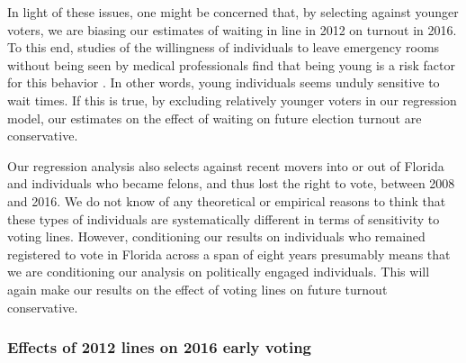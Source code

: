 \documentclass[12pt,titlepage]{article}
\begin{document}
In light of these issues, one might be concerned that, by selecting
against younger voters, we are biasing our estimates of waiting in
line in 2012 on turnout in 2016.  To this end, studies of the
willingness of individuals to leave emergency rooms without being seen
by medical professionals find that being young is a risk factor for
this behavior
\citep{sunetal:lwbs,clareycooke:emergencyroomleave,shaikh:howlongwaiter}.
In other words, young individuals seems unduly sensitive to wait
times.  If this is true, by excluding relatively younger voters in our
regression model, our estimates on the effect of waiting on future
election turnout are conservative.

Our regression analysis also selects against recent movers into or out
of Florida and individuals who became felons, and thus lost the right
to vote, between 2008 and 2016.  We do not know of any theoretical or
empirical reasons to think that these types of individuals are
systematically different in terms of sensitivity to voting lines.
However, conditioning our results on individuals who remained
registered to vote in Florida across a span of eight years presumably
means that we are conditioning our analysis on politically engaged
individuals.  This will again make our results on the effect of voting
lines on future turnout conservative.




\subsubsection*{Effects of 2012 lines on 2016 early voting}
\end{document}

